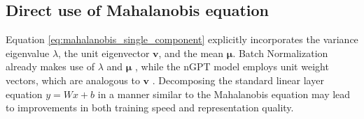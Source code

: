 \subsection{Direct use of Mahalanobis equation}

Equation \ref{eq:mahalanobis_single_component} explicitly incorporates the variance eigenvalue $\lambda$, the unit eigenvector $\mathbf{v}$, and the mean $\boldsymbol{\mu}$. Batch Normalization already makes use of $\lambda$ and $\boldsymbol{\mu}$ \citep{ioffe2015batch}, while the nGPT model employs unit weight vectors, which are analogous to $\mathbf{v}$ \citep{loshchilov2024ngptnormalizedtransformerrepresentation}. Decomposing the standard linear layer equation $y = Wx + b$ in a manner similar to the Mahalanobis equation may lead to improvements in both training speed and representation quality.

